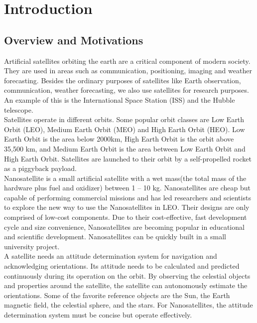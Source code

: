 
\chapter{Introduction}
\label{chap:intro}

\section{Overview and Motivations}

Artificial satellites orbiting the earth are a critical component of modern society. They are used in areas such as communication, positioning, imaging and weather forecasting. Besides the ordinary purposes of satellites like Earth observation, communication, weather forecasting\cite{How_satellites_rule_our_world}, we also use satellites for research purposes. An example of this is the International Space Station (ISS) and the Hubble telescope. \\

\noindent Satellites operate in different orbits. Some popular orbit classes are Low Earth Orbit (LEO), Medium Earth Orbit (MEO) and High Earth Orbit (HEO)\cite{sat_wiki}. Low Earth Orbit is the area below 2000km, High Earth Orbit is the orbit above 35,500 km, and Medium Earth Orbit is the area between Low Earth Orbit and High Earth Orbit. Satellites are launched to their orbit by a self-propelled rocket as a piggyback payload. \\

\noindent Nanosatellite is a small artificial satellite with a wet mass(the total mass of the hardware plus fuel and oxidizer) between 1 – 10 kg. Nanosatellites are cheap but capable of performing commercial missions and has led researchers and scientists to explore the new way to use the Nanosatellites in LEO\cite{network}. Their designs are only comprised of low-cost components. Due to their cost-effective, fast development cycle and size convenience, Nanosatellites are becoming popular in educational and scientific development. Nanosatellites can be quickly built in a small university project. \\

\noindent A satellite needs an attitude determination system for navigation and acknowledging orientations. Its attitude needs to be calculated and predicted continuously during its operation on the orbit. By observing the celestial objects and properties around the satellite, the satellite can autonomously estimate the orientations. Some of the favorite reference objects are the Sun, the Earth magnetic field, the celestial sphere, and the stars. For Nanosatellites, the attitude determination system must be concise but operate effectively.

